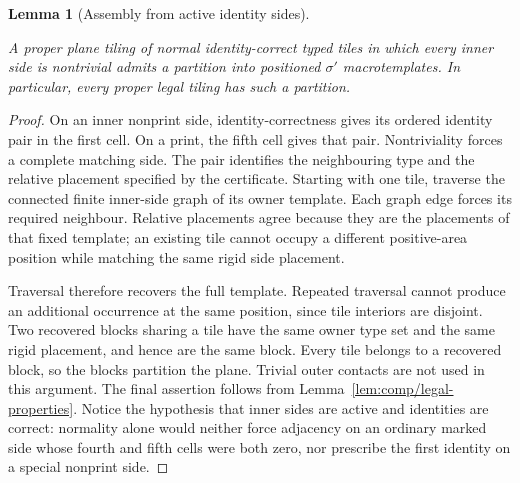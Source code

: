 \documentclass[11pt,a4paper]{article}
\newtheorem{lemma}[definition]{Lemma}
\theoremstyle{remark}
\newcommand{\lean}[1]{}
\newcommand{\uses}[1]{}
\begin{document}
\begin{lemma}[Assembly from active identity sides]
\label{lem:comp/assembly}
\lean{Tilings.Planned.assembleMacrotemplates,Tilings.Planned.Strict.strict_assembleMacrotemplates}
\uses{def:certificate,def:control/typed-decoration,def:control/legal,def:tiling}
A proper plane tiling of normal identity-correct typed tiles in which every
inner side is nontrivial admits a partition into positioned $\sigma'$ macrotemplates.
In particular, every proper legal tiling has such a partition.
\end{lemma}
\begin{proof}
On an inner nonprint side, identity-correctness gives its ordered identity
pair in the first cell. On a print, the fifth cell gives that pair.
Nontriviality forces a complete matching side. The pair identifies the
neighbouring type and the relative placement specified by the certificate.
Starting with one tile, traverse the connected finite inner-side graph of
its owner template. Each graph edge forces its required neighbour. Relative
placements agree because they are the placements of that fixed template;
an existing tile cannot occupy a different positive-area position while
matching the same rigid side placement.

Traversal therefore recovers the full template. Repeated traversal cannot
produce an additional occurrence at the same position, since tile interiors
are disjoint. Two recovered blocks sharing a tile have the same owner type
set and the same rigid placement, and hence are the same block. Every tile
belongs to a recovered block, so the blocks partition the plane. Trivial
outer contacts are not used in this argument. The final assertion follows
from Lemma~\ref{lem:comp/legal-properties}. Notice the hypothesis that inner
sides are active and identities are correct: normality alone would neither
force adjacency on an ordinary marked side whose fourth and fifth cells
were both zero, nor prescribe the first identity on a special nonprint side.
\end{proof}
\end{document}
